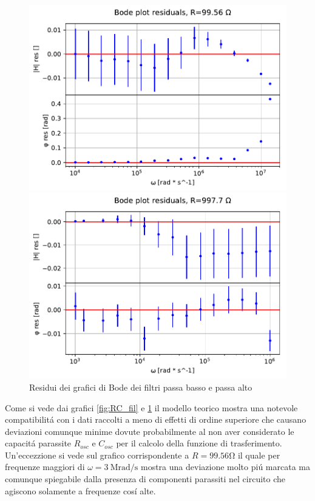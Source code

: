 \documentclass{article}
\begin{document}
\begin{figure}[H]
\begin{minipage}{0.5\textwidth}
        \includegraphics[width=\textwidth]{bodeplot_res3.pdf} 
    \end{minipage}\hfill
    \begin{minipage}{0.5\textwidth}
        \centering
        \includegraphics[width=\textwidth]{bodeplot_res4.pdf} 
    \end{minipage}
    \caption{Residui dei grafici di Bode dei filtri passa basso e passa alto}
    \label{fig:RC_fil_res}
\end{figure}

Come si vede dai grafici \ref{fig:RC_fil} e \ref{fig:RC_fil_res} il modello teorico mostra una notevole compatibilit\'a con i dati raccolti a meno di effetti di ordine superiore che causano deviazioni comunque minime dovute probabilmente al non aver considerato le capacit\'a parassite $R_{osc}$ e $C_{osc}$ per il calcolo della funzione di trasferimento. Un'eccezzione si vede sul grafico corrispondente a $R=99.56 \si{\ohm}$ il quale per frequenze maggiori di $\omega = 3\ \si{\mega\radian\per\second}$ mostra una deviazione molto pi\'u marcata ma comunque spiegabile dalla presenza di componenti parassiti nel circuito che agiscono solamente a frequenze cos\'i alte.
\end{document}
